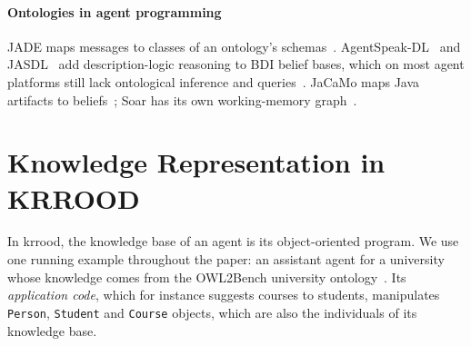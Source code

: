 \documentclass[sigconf,anonymous]{aamas}
\begin{document}
\paragraph{Ontologies in agent programming}
JADE maps messages to classes of an ontology's schemas~\cite{bellifemine2007jade,caire2010jadeontology}. AgentSpeak-DL~\cite{moreira2006agentspeakdl} and JASDL~\cite{klapiscak2009jasdl} add description-logic reasoning to BDI belief bases, which on most agent platforms still lack ontological inference and queries~\cite{burattini2025gap,longo2025t2b2t}. JaCaMo maps Java artifacts to beliefs~\cite{boissier2013jacamo,ricci2011cartago}; Soar has its own working-memory graph~\cite{laird2012soar}.

\section{Knowledge Representation in KRROOD}
\label{sec:kr}

In \ac{krrood}, the knowledge base of an agent is its object-oriented program. We use one running example throughout the paper: an assistant agent for a university whose knowledge comes from the OWL2Bench university ontology~\cite{singh2020owl2bench}. Its \emph{application code}, which for instance suggests courses to students, manipulates \texttt{Person}, \texttt{Student} and \texttt{Course} objects, which are also the individuals of its knowledge base.
\end{document}
